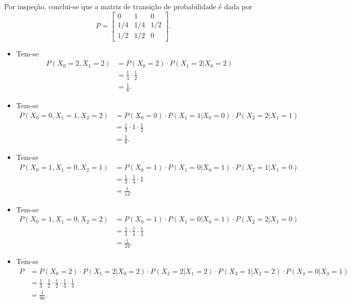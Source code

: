\begin{respostas}
    Por inspeção, conclui-se que a matriz de transição de probabilidade é dada por
    $$
    P = \begin{bmatrix}
        0 & 1 & 0 \\
        1/4 & 1/4 & 1/2 \\
        1/2 & 1/2 & 0
    \end{bmatrix}.
    $$

    \begin{itemize}
        \item [a)] Tem-se
        \begin{align}
            P(X_0 = 2, X_1 = 2) &= P(X_0 = 2) \cdot P(X_1 = 2 | X_0 = 2) \\
            &= \frac{1}{3} \cdot \frac{1}{2} \\
            &= \frac{1}{6}.
        \end{align}

        \item [b)] Tem-se
        \begin{align}
            P(X_0 = 0, X_1 = 1, X_2 = 2) &= P(X_0 = 0) \cdot P(X_1 = 1 | X_0 = 0) \cdot P(X_2 = 2 | X_1 = 1) \\
            &= \frac{1}{3} \cdot 1 \cdot \frac{1}{2} \\
            &= \frac{1}{6}.
        \end{align}

        \item [c)] Tem-se
        \begin{align}
            P(X_0 = 1, X_1 = 0, X_2 = 1) &= P(X_0 = 1) \cdot P(X_1 = 0 | X_0 = 1) \cdot P(X_2 = 1 | X_1 = 0) \\
            &= \frac{1}{3} \cdot \frac{1}{4} \cdot 1 \\
            &= \frac{1}{12}.
        \end{align}

        \item [d)] Tem-se
        \begin{align}
            P(X_0 = 1, X_1 = 0, X_2 = 2) &= P(X_0 = 1) \cdot P(X_1 = 0 | X_0 = 1) \cdot P(X_2 = 2 | X_1 = 0) \\
            &= \frac{1}{3} \cdot \frac{1}{4} \cdot \frac{1}{2} \\
            &= \frac{1}{24}.
        \end{align}

        \item [e)] Tem-se
        \begin{align}
            P &= P(X_0 = 2) \cdot P(X_1 = 2 | X_0 = 2) \cdot P(X_2 = 2 | X_1 = 2) \cdot P(X_3 = 1 | X_2 = 2) \cdot P(X_4 = 0 | X_3 = 1) \\
            &= \frac{1}{3} \cdot \frac{1}{2} \cdot \frac{1}{2} \cdot \frac{1}{4} \cdot \frac{1}{4} \\
            &= \frac{1}{96}.
        \end{align}
    \end{itemize}
\end{respostas}